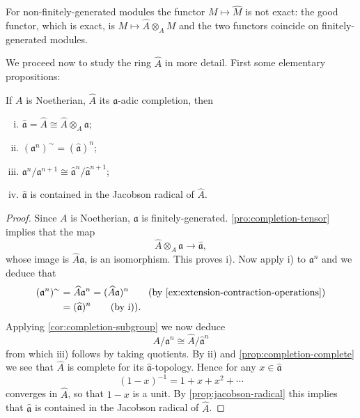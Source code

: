 \begin{remark}
For non-finitely-generated modules the functor $M \mapsto \widehat{M}$ is not exact: the good functor, which is exact, is $M \mapsto \widehat{A} \otimes_A M$ and the two functors coincide on finitely-generated modules.
\end{remark}

We proceed now to study the ring $\widehat{A}$ in more detail. First some elementary propositions:

\begin{proposition}\label{prop:10.15}
    If $A$ is Noetherian, $\widehat{A}$ its $\mathfrak{a}$-adic completion, then 
    \begin{enumerate}[i)]
        \item $\widehat{\mathfrak{a}} = \widehat{A} \cong \widehat{A} \otimes_A \mathfrak{a}$;  
        \item $(\mathfrak{a}^n)^\sim = (\widehat{\mathfrak{a}})^n$;  
        \item $\mathfrak{a}^n/\mathfrak{a}^{n+1} \cong \widehat{\mathfrak{a}}^n/\widehat{\mathfrak{a}}^{n+1}$;  
        \item $\widehat{\mathfrak{a}}$ is contained in the Jacobson radical of $\widehat{A}$.
    \end{enumerate}
\end{proposition}

\begin{proof}
    Since $A$ is Noetherian, $\mathfrak{a}$ is finitely-generated. \eqref{pro:completion-tensor} implies that the map  
    \[
    \widehat{A} \otimes_A \mathfrak{a} \to \widehat{\mathfrak{a}},
    \]  
    whose image is $\widehat{A}\mathfrak{a}$, is an isomorphism. This proves i). Now apply i) to $\mathfrak{a}^n$ and we deduce that  
    \begin{align}
        (\mathfrak{a}^n)^\sim &= \widehat{A} \mathfrak{a}^n = (\widehat{A} \mathfrak{a})^n \tag{by \eqref{ex:extension-contraction-operations}} \\ &= (\widehat{\mathfrak{a}})^n \tag{by i)}.
    \end{align}
    Applying \eqref{cor:completion-subgroup} we now deduce  
    \[
    A/\mathfrak{a}^n \cong \widehat{A}/\widehat{\mathfrak{a}}^n
    \]  
    from which iii) follows by taking quotients. By ii) and \eqref{prop:completion-complete} we see that $\widehat{A}$ is complete for its $\widehat{\mathfrak{a}}$-topology. Hence for any $x \in \widehat{\mathfrak{a}}$  
    \[
    (1 - x)^{-1} = 1 + x + x^2 + \cdots
    \]  
    converges in $\widehat{A}$, so that $1 - x$ is a unit. By \eqref{prop:jacobson-radical} this implies that $\widehat{\mathfrak{a}}$ is contained in the Jacobson radical of $\widehat{A}$. 
\end{proof}

